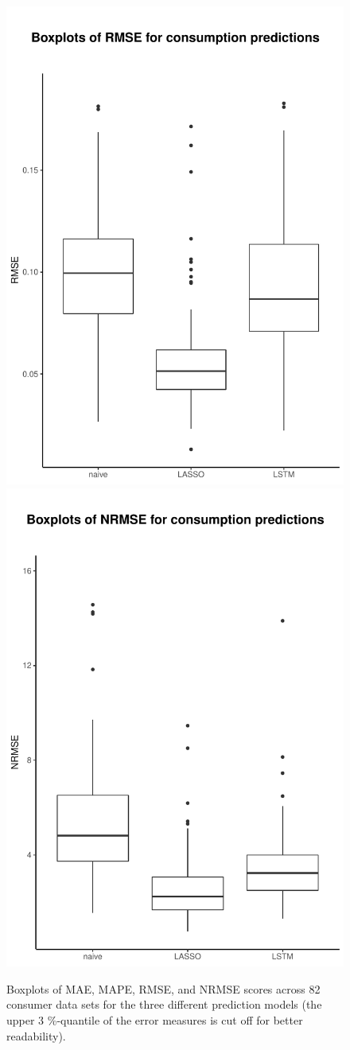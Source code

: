 \begin{figure}
    \includegraphics[width=.5\textwidth-5pt]{thesis/graphs/evaluation/c_boxplot_RMSE.pdf}
    \includegraphics[width=.5\textwidth-5pt]{thesis/graphs/evaluation/c_boxplot_NRMSE.pdf} \\
    \caption[Boxplots of MAE, MAPE, RMSE, and NRMSE scores across consumer data sets]{Boxplots of MAE, MAPE, RMSE, and NRMSE scores across 82 consumer data sets for the three different prediction models (the upper 3 \%-quantile of the error measures is cut off for better readability). \quantnet\href{}{}}
    \label{Fig:boxplots_errormeasures}
\end{figure}
%

